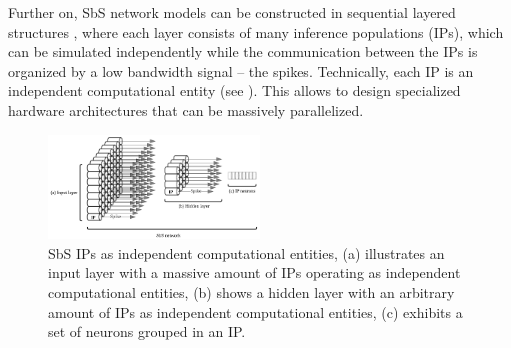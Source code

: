 Further on,  SbS network models can be constructed in sequential layered structures \cite{rotermund2019Backpropagation}, where each layer consists of many inference populations (IPs), which can be simulated independently while the communication between the IPs is organized by a low bandwidth signal -- the spikes. Technically, each IP is an independent computational entity (see ). This allows to design specialized hardware architectures that can be massively parallelized.

\begin{figure}
	\centering
	\includegraphics[width=0.5\textwidth]{../figures/SbS_layer.pdf}
	\caption{SbS IPs as independent computational entities, (a) illustrates an input layer with a massive amount of IPs operating as independent computational entities, (b) shows a hidden layer with an arbitrary amount of IPs as independent computational entities, (c) exhibits a set of neurons grouped in an IP. }
	\label{fig:SbS_layer}
\end{figure}




